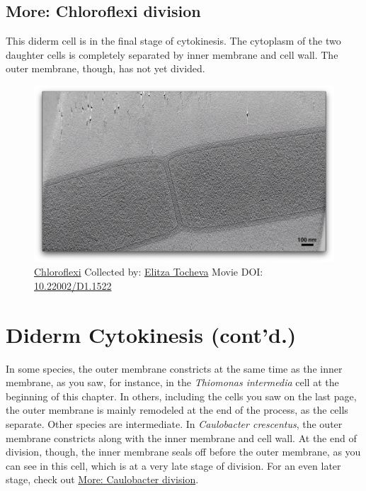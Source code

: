 \documentclass[]{tufte-book}
\begin{document}
\hypertarget{Chloroflexi_division}{\subsection*{More: Chloroflexi
division}\label{Chloroflexi_division}}

This diderm cell is in the final stage of cytokinesis. The cytoplasm of
the two daughter cells is completely separated by inner membrane and
cell wall. The outer membrane, though, has not yet divided.





\begin{figure}
\includegraphics{movie_stills/5_6b} \caption[\protect\hyperlink{tree}{Chloroflexi} Collected by:
\protect\hyperlink{elitza_tocheva}{Elitza Tocheva} Movie DOI:
\href{https://doi.org/10.22002/D1.1522}{10.22002/D1.1522}]{\protect\hyperlink{tree}{Chloroflexi} Collected by:
\protect\hyperlink{elitza_tocheva}{Elitza Tocheva} Movie DOI:
\href{https://doi.org/10.22002/D1.1522}{10.22002/D1.1522}}\label{fig:5-6b}
\end{figure}

\section{Diderm Cytokinesis (cont'd.)}\label{diderm-cytokinesis-contd.}

In some species, the outer membrane constricts at the same time as the
inner membrane, as you saw, for instance, in the \emph{Thiomonas
intermedia} cell at the beginning of this chapter. In others, including
the cells you saw on the last page, the outer membrane is mainly
remodeled at the end of the process, as the cells separate. Other
species are intermediate. In \emph{Caulobacter crescentus}, the outer
membrane constricts along with the inner membrane and cell wall. At the
end of division, though, the inner membrane seals off before the outer
membrane, as you can see in this cell, which is at a very late stage of
division. For an even later stage, check out
\protect\hyperlink{Caulobacter_division}{More: Caulobacter division}.
\end{document}

